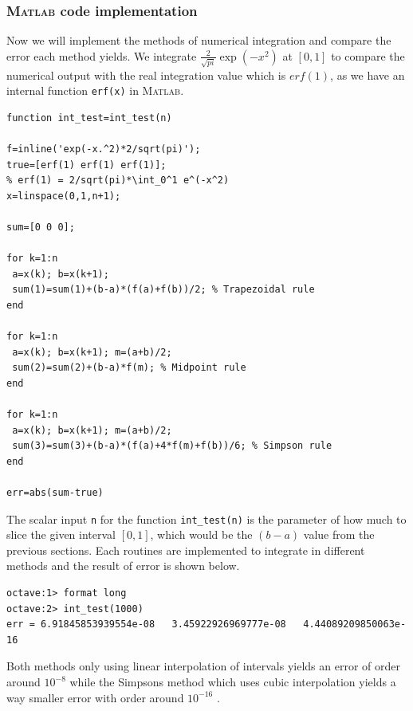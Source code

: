 \documentclass[paper=a4, fontsize=11pt]{scrartcl}
\newcommand{\MATLAB}{\textsc{Matlab}\xspace}
\begin{document}
\vspace{0.15in}
\subsubsection{\MATLAB code implementation}
\vspace{0.15in}

Now we will implement the methods of numerical integration and compare the error each method yields. We integrate $\frac{2}{\sqrt{pi}}\exp(-x^2)$ at $[0,1]$ to compare the numerical output with the real integration value which is $erf(1)$, as we have an internal function \texttt{erf(x)} in \MATLAB. \\

\begin{lstlisting}[caption = 'int\_test.m']
function int_test=int_test(n)

f=inline('exp(-x.^2)*2/sqrt(pi)');
true=[erf(1) erf(1) erf(1)];
% erf(1) = 2/sqrt(pi)*\int_0^1 e^(-x^2)
x=linspace(0,1,n+1);

sum=[0 0 0];

for k=1:n
 a=x(k); b=x(k+1); 
 sum(1)=sum(1)+(b-a)*(f(a)+f(b))/2; % Trapezoidal rule
end

for k=1:n
 a=x(k); b=x(k+1); m=(a+b)/2; 
 sum(2)=sum(2)+(b-a)*f(m); % Midpoint rule
end

for k=1:n
 a=x(k); b=x(k+1); m=(a+b)/2;
 sum(3)=sum(3)+(b-a)*(f(a)+4*f(m)+f(b))/6; % Simpson rule
end

err=abs(sum-true)
\end{lstlisting}
\vspace{0.15in}

The scalar input \texttt{n} for the function \texttt{int\_test(n)} is the parameter of how much to slice the given interval $[0,1]$, which would be the $(b-a)$ value from the previous sections. Each routines are implemented to integrate in different methods and the result of error is shown below.

\begin{verbatim}
octave:1> format long
octave:2> int_test(1000)
err = 6.91845853939554e-08   3.45922926969777e-08   4.44089209850063e-16	
\end{verbatim}

Both methods only using linear interpolation of intervals yields an error of order around $10^{-8}$ while the Simpsons method which uses cubic interpolation yields a way smaller error with order around $10^{-16}$ .
\end{document}
